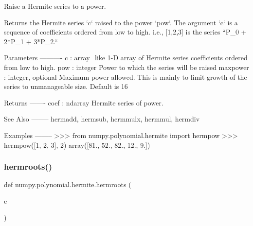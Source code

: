 \begin{DoxyVerb}Raise a Hermite series to a power.

Returns the Hermite series `c` raised to the power `pow`. The
argument `c` is a sequence of coefficients ordered from low to high.
i.e., [1,2,3] is the series  ``P_0 + 2*P_1 + 3*P_2.``

Parameters
----------
c : array_like
    1-D array of Hermite series coefficients ordered from low to
    high.
pow : integer
    Power to which the series will be raised
maxpower : integer, optional
    Maximum power allowed. This is mainly to limit growth of the series
    to unmanageable size. Default is 16

Returns
-------
coef : ndarray
    Hermite series of power.

See Also
--------
hermadd, hermsub, hermmulx, hermmul, hermdiv

Examples
--------
>>> from numpy.polynomial.hermite import hermpow
>>> hermpow([1, 2, 3], 2)
array([81.,  52.,  82.,  12.,   9.])\end{DoxyVerb}
 \mbox{\label{namespacenumpy_1_1polynomial_1_1hermite_a1e3a29f02bfce00a0eff1c5538e55af0}} 
\subsubsection{\texorpdfstring{hermroots()}{hermroots()}}
{\footnotesize\ttfamily def numpy.\+polynomial.\+hermite.\+hermroots (\begin{DoxyParamCaption}\item[{}]{c }\end{DoxyParamCaption})}

